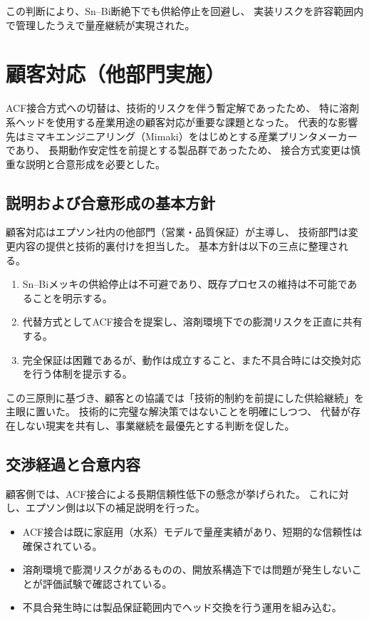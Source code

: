 \documentclass[conference]{IEEEtran}
\begin{document}
この判断により、Sn–Bi断絶下でも供給停止を回避し、  
実装リスクを許容範囲内で管理したうえで量産継続が実現された。

\section{顧客対応（他部門実施）}

ACF接合方式への切替は、技術的リスクを伴う暫定解であったため、  
特に溶剤系ヘッドを使用する産業用途の顧客対応が重要な課題となった。  
代表的な影響先はミマキエンジニアリング（Mimaki）をはじめとする産業プリンタメーカーであり、  
長期動作安定性を前提とする製品群であったため、  
接合方式変更は慎重な説明と合意形成を必要とした。

\subsection{説明および合意形成の基本方針}
顧客対応はエプソン社内の他部門（営業・品質保証）が主導し、  
技術部門は変更内容の提供と技術的裏付けを担当した。  
基本方針は以下の三点に整理される。

\begin{enumerate}
  \item Sn–Biメッキの供給停止は不可避であり、既存プロセスの維持は不可能であることを明示する。  
  \item 代替方式としてACF接合を提案し、溶剤環境下での膨潤リスクを正直に共有する。  
  \item 完全保証は困難であるが、動作は成立すること、また不具合時には交換対応を行う体制を提示する。  
\end{enumerate}

この三原則に基づき、顧客との協議では「技術的制約を前提にした供給継続」を主眼に置いた。  
技術的に完璧な解決策ではないことを明確にしつつ、  
代替が存在しない現実を共有し、事業継続を最優先とする判断を促した。

\subsection{交渉経過と合意内容}
顧客側では、ACF接合による長期信頼性低下の懸念が挙げられた。  
これに対し、エプソン側は以下の補足説明を行った。

\begin{itemize}
  \item ACF接合は既に家庭用（水系）モデルで量産実績があり、短期的な信頼性は確保されている。  
  \item 溶剤環境で膨潤リスクがあるものの、開放系構造下では問題が発生しないことが評価試験で確認されている。  
  \item 不具合発生時には製品保証範囲内でヘッド交換を行う運用を組み込む。  
\end{itemize}
\end{document}
